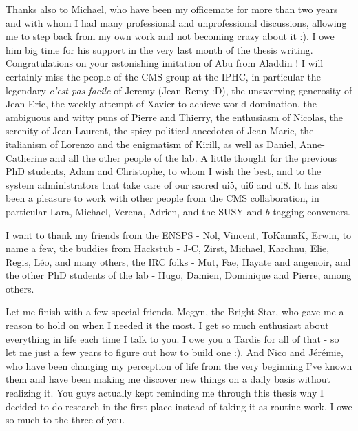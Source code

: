 Thanks also to Michael, who have been my officemate for more than two years and
with whom I had many professional and unprofessional discussions, allowing me to
step back from my own work and not becoming crazy about it :). I owe him big
time for his support in the very last month of the thesis writing.
Congratulations on your astonishing imitation of Abu from Aladdin ! I will
certainly miss the people of the CMS group at the IPHC, in particular the
legendary \emph{c'est pas facile} of Jeremy (Jean-Remy :D), the unswerving
generosity of Jean-Eric, the weekly attempt of Xavier to achieve world
domination, the ambiguous and witty puns of Pierre and Thierry, the enthusiasm
of Nicolas, the serenity of Jean-Laurent, the spicy political anecdotes of
Jean-Marie, the italianism of Lorenzo and the enigmatism of Kirill, as well as
Daniel, Anne-Catherine and all the other people of the lab. A little thought for
the previous PhD students, Adam and Christophe, to whom I wish the best, and to
the system administrators that take care of our sacred ui5, ui6 and ui8. It has
also been a pleasure to work with other people from the CMS collaboration, in
particular Lara, Michael, Verena, Adrien, and the SUSY and $b$-tagging
conveners.

I want to thank my friends from the ENSPS - Nol, Vincent, ToKamaK, Erwin, to
name a few, the buddies from Hackstub - J-C, Zirst, Michael, Karchnu, Elie,
Regis, Léo, and many others, the IRC folks - Mut, Fae, Hayate and angenoir, and
the other PhD students of the lab - Hugo, Damien, Dominique and Pierre, among
others.

Let me finish with a few special friends. Megyn, the Bright Star, who gave me a
reason to hold on when I needed it the most. I get so much enthusiast about
everything in life each time I talk to you. I owe you a Tardis for all of that -
so let me just a few years to figure out how to build one :). And Nico and
Jérémie, who have been changing my perception of life from the very beginning
I've known them and have been making me discover new things on a daily basis
without realizing it. You guys actually kept reminding me through this thesis
why I decided to do research in the first place instead of taking it as routine
work. I owe so much to the three of you.

\emptypage
\thispagestyle{empty}

\singlespace
\dominitoc
\renewcommand{\leftmark}{Contents}
\tableofcontents
\onehalfspacing

\emptypage

